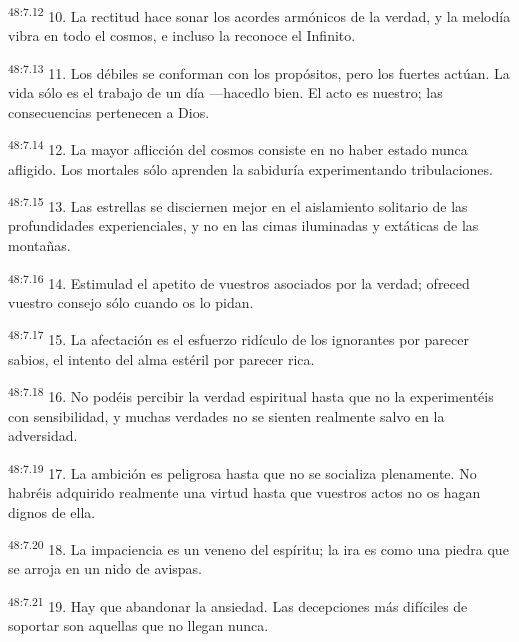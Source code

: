 \par
\textsuperscript{48:7.12} 10. La rectitud hace sonar los acordes armónicos de la verdad, y la melodía vibra en todo el cosmos, e incluso la reconoce el Infinito.

\par
\textsuperscript{48:7.13} 11. Los débiles se conforman con los propósitos, pero los fuertes actúan. La vida sólo es el trabajo de un día ---hacedlo bien. El acto es nuestro; las consecuencias pertenecen a Dios.

\par
\textsuperscript{48:7.14} 12. La mayor aflicción del cosmos consiste en no haber estado nunca afligido. Los mortales sólo aprenden la sabiduría experimentando tribulaciones.

\par
\textsuperscript{48:7.15} 13. Las estrellas se disciernen mejor en el aislamiento solitario de las profundidades experienciales, y no en las cimas iluminadas y extáticas de las montañas.

\par
\textsuperscript{48:7.16} 14. Estimulad el apetito de vuestros asociados por la verdad; ofreced vuestro consejo sólo cuando os lo pidan.

\par
\textsuperscript{48:7.17} 15. La afectación es el esfuerzo ridículo de los ignorantes por parecer sabios, el intento del alma estéril por parecer rica.

\par
\textsuperscript{48:7.18} 16. No podéis percibir la verdad espiritual hasta que no la experimentéis con sensibilidad, y muchas verdades no se sienten realmente salvo en la adversidad.

\par
\textsuperscript{48:7.19} 17. La ambición es peligrosa hasta que no se socializa plenamente. No habréis adquirido realmente una virtud hasta que vuestros actos no os hagan dignos de ella.

\par
\textsuperscript{48:7.20} 18. La impaciencia es un veneno del espíritu; la ira es como una piedra que se arroja en un nido de avispas.

\par
\textsuperscript{48:7.21} 19. Hay que abandonar la ansiedad. Las decepciones más difíciles de soportar son aquellas que no llegan nunca.

